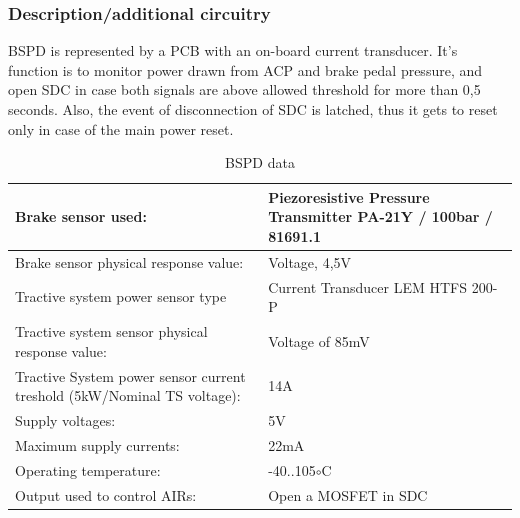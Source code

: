 
\subsubsection{Description/additional circuitry}

BSPD is represented by a PCB with an on-board current transducer. It’s function is to monitor
power drawn from ACP and brake pedal pressure, and open SDC in case both signals are above
allowed threshold for more than 0,5 seconds. Also, the event of disconnection of SDC is latched,
thus it gets to reset only in case of the main power reset.



\begin{table}[H]
	\centering
	\caption{BSPD data}
	\begin{tabularx}{\textwidth}{|X|X|}
		\hline
		Brake sensor used: & Piezoresistive Pressure Transmitter PA-21Y / 100bar / 81691.1 \\[\TableSize]
		\hline
		Brake sensor physical response value: & Voltage, 4,5V \\[\TableSize]
		\hline
		Tractive system power sensor type & Current Transducer LEM HTFS 200-P \\[\TableSize]
		\hline
		Tractive system sensor physical response value: & Voltage of 85mV \\[\TableSize]
		\hline
		Tractive System power sensor current treshold (5kW/Nominal TS voltage): & 14A \\[\TableSize]
		\hline
		Supply voltages: & 5V \\[\TableSize]
		\hline
		Maximum supply currents: & 22mA \\[\TableSize]
		\hline
		Operating temperature: & -40..105$\circ$C\\[\TableSize]
		\hline
		Output used to control AIRs: & Open a MOSFET in SDC \\[\TableSize]
		\hline
	\end{tabularx}%
	\label{tab:addlabel}%
\end{table}%

